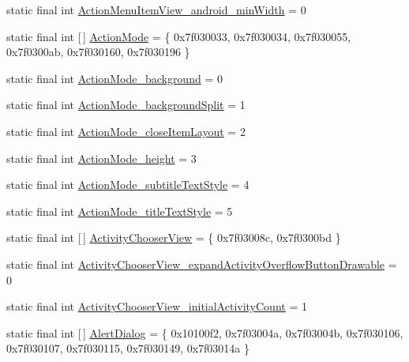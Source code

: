 \begin{DoxyCompactItemize}
static final int \mbox{\hyperlink{classandroid_1_1support_1_1design_1_1_r_1_1styleable_acb1426b9ed9e5ecec8248ef97861f86c}{Action\+Menu\+Item\+View\+\_\+android\+\_\+min\+Width}} = 0
\item 
static final int \mbox{[}$\,$\mbox{]} \mbox{\hyperlink{classandroid_1_1support_1_1design_1_1_r_1_1styleable_aece7cc3345738baf4a59955f870e1507}{Action\+Mode}} = \{ 0x7f030033, 0x7f030034, 0x7f030055, 0x7f0300ab, 0x7f030160, 0x7f030196 \}
\item 
static final int \mbox{\hyperlink{classandroid_1_1support_1_1design_1_1_r_1_1styleable_a2fcf62896806a253284078a92c738931}{Action\+Mode\+\_\+background}} = 0
\item 
static final int \mbox{\hyperlink{classandroid_1_1support_1_1design_1_1_r_1_1styleable_a4cfd294b7efa80be3857b174e845a22b}{Action\+Mode\+\_\+background\+Split}} = 1
\item 
static final int \mbox{\hyperlink{classandroid_1_1support_1_1design_1_1_r_1_1styleable_aa67ed1373f9b46d1e3338368326909dd}{Action\+Mode\+\_\+close\+Item\+Layout}} = 2
\item 
static final int \mbox{\hyperlink{classandroid_1_1support_1_1design_1_1_r_1_1styleable_a14760d08c455c5f160e63389c6e0a2a8}{Action\+Mode\+\_\+height}} = 3
\item 
static final int \mbox{\hyperlink{classandroid_1_1support_1_1design_1_1_r_1_1styleable_a10bc3c198873b4b55ca3d7a3a03b0b3d}{Action\+Mode\+\_\+subtitle\+Text\+Style}} = 4
\item 
static final int \mbox{\hyperlink{classandroid_1_1support_1_1design_1_1_r_1_1styleable_a00160252e8c184b0cb941db7fa9b3422}{Action\+Mode\+\_\+title\+Text\+Style}} = 5
\item 
static final int \mbox{[}$\,$\mbox{]} \mbox{\hyperlink{classandroid_1_1support_1_1design_1_1_r_1_1styleable_a793c8e02386efdda6b3cf815e635b3fe}{Activity\+Chooser\+View}} = \{ 0x7f03008c, 0x7f0300bd \}
\item 
static final int \mbox{\hyperlink{classandroid_1_1support_1_1design_1_1_r_1_1styleable_a0f59ec2d875fa33d8606d30a159009e2}{Activity\+Chooser\+View\+\_\+expand\+Activity\+Overflow\+Button\+Drawable}} = 0
\item 
static final int \mbox{\hyperlink{classandroid_1_1support_1_1design_1_1_r_1_1styleable_ac585173d17be15bb17e5558aecd007fc}{Activity\+Chooser\+View\+\_\+initial\+Activity\+Count}} = 1
\item 
static final int \mbox{[}$\,$\mbox{]} \mbox{\hyperlink{classandroid_1_1support_1_1design_1_1_r_1_1styleable_aeccb758d25f6e242e6f3a23f3873ec21}{Alert\+Dialog}} = \{ 0x10100f2, 0x7f03004a, 0x7f03004b, 0x7f030106, 0x7f030107, 0x7f030115, 0x7f030149, 0x7f03014a \}

\end{DoxyCompactItemize}
